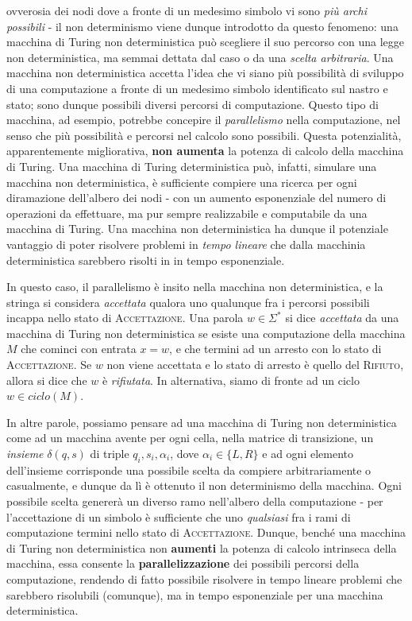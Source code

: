 \documentclass[10pt]{book}
\begin{document}
ovverosia dei nodi dove a fronte di un medesimo simbolo vi sono \emph{più archi
possibili} \-- il non determinismo viene dunque introdotto da questo fenomeno:
una macchina di Turing non deterministica può scegliere il suo percorso con una
legge non deterministica, ma semmai dettata dal caso o da una \emph{scelta
arbitraria}. Una macchina non deterministica accetta l'idea che vi siano più
possibilità di sviluppo di una computazione a fronte di un medesimo simbolo
identificato sul nastro e stato; sono dunque possibili diversi percorsi di
computazione. Questo tipo di macchina, ad esempio, potrebbe concepire il
\emph{parallelismo} nella computazione, nel senso che più possibilità e
percorsi nel calcolo sono possibili. Questa potenzialità, apparentemente
migliorativa, \textbf{non aumenta} la potenza di calcolo della macchina di
Turing. Una macchina di Turing deterministica può, infatti, simulare una
macchina non deterministica, è sufficiente compiere una ricerca per ogni
diramazione dell'albero dei nodi \-- con un aumento esponenziale del numero di
operazioni da effettuare, ma pur sempre realizzabile e computabile da una
macchina di Turing. Una macchina non deterministica ha dunque il potenziale
vantaggio di poter risolvere problemi in \emph{tempo lineare} che dalla
macchinia deterministica sarebbero risolti in in tempo esponenziale.

In questo caso, il parallelismo è insito nella macchina non deterministica, e
la stringa si considera \emph{accettata} qualora uno qualunque fra i percorsi
possibili incappa nello stato di \textsc{Accettazione}. Una parola $w \in
\Sigma^*$ si dice \emph{accettata} da una macchina di Turing non deterministica se
esiste una computazione della macchina $M$ che cominci con entrata $x=w$, e che
termini ad un arresto con lo stato di \textsc{Accettazione}. Se $w$ non viene
accettata e lo stato di arresto è quello del \textsc{Rifiuto}, allora si dice
che $w$ è \emph{rifiutata}. In alternativa, siamo di fronte ad un ciclo $w \in
ciclo(M)$.

In altre parole, possiamo pensare ad una macchina di Turing non deterministica
come ad un macchina avente per ogni cella, nella matrice di transizione, un
\emph{insieme} $\delta(q,s)$ di triple $q_i, s_i, \alpha_i$, dove $\alpha_i \in
\{L,R\}$ e ad ogni elemento dell'insieme corrisponde una possibile scelta da
compiere arbitrariamente o casualmente, e dunque da lì è ottenuto il non
determinismo della macchina. Ogni possibile scelta genererà un diverso ramo
nell'albero della computazione \-- per l'accettazione di un simbolo è
sufficiente che uno \emph{qualsiasi} fra i rami di computazione termini nello
stato di \textsc{Accettazione}. Dunque, benché una macchina di Turing non
deterministica non \textbf{aumenti} la potenza di calcolo intrinseca della
macchina, essa consente la \textbf{parallelizzazione} dei possibili percorsi
della computazione, rendendo di fatto possibile risolvere in tempo lineare
problemi che sarebbero risolubili (comunque), ma in tempo esponenziale per una
macchina deterministica.
\end{document}
